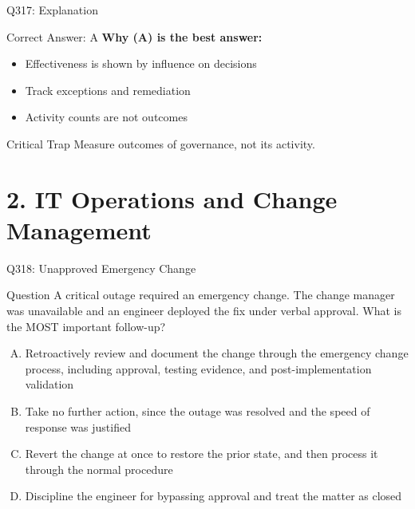 \documentclass{beamer}
\begin{document}
	\begin{frame}{Q317: Explanation}
		\begin{block}{Correct Answer: A}
			\textbf{Why (A) is the best answer:}
			\begin{itemize}
				\item Effectiveness is shown by influence on decisions
				\item Track exceptions and remediation
				\item Activity counts are not outcomes
			\end{itemize}
		\end{block}
		\begin{alertblock}{Critical Trap}
			Measure outcomes of governance, not its activity.
		\end{alertblock}
	\end{frame}
		
	\section{2. IT Operations and Change Management}
	
	\begin{frame}{Q318: Unapproved Emergency Change}
		\begin{block}{Question}
			\small A critical outage required an emergency change. The change manager was unavailable and an engineer deployed the fix under verbal approval. What is the MOST important follow-up?
		\end{block}
		\begin{enumerate}[(A)]
			\footnotesize
			\item Retroactively review and document the change through the emergency change process, including approval, testing evidence, and post-implementation validation
			\item Take no further action, since the outage was resolved and the speed of response was justified
			\item Revert the change at once to restore the prior state, and then process it through the normal procedure
			\item Discipline the engineer for bypassing approval and treat the matter as closed
		\end{enumerate}
	\end{frame}
	
\end{document}
